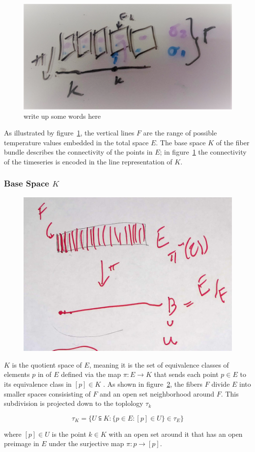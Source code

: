 \documentclass[../main.tex]{subfiles}
\begin{document}
\begin{figure}[ht]
    \includegraphics[width=.2\linewidth]{figures/sections/math/fiberbundle.png}
    \caption{write up some words here}
    \label{fig:fiberbundle}
\end{figure}

As illustrated by figure~\ref{fig:fiberbundle}, the vertical lines $F$ are the range of possible temperature values embedded in the total space $E$. The base space $K$ of the fiber bundle describes the connectivity of the points in $E$; in figure~\ref{fig:fiberbundle} the connectivity of the timeseries is encoded in the line representation of $K$. 

\subsubsection{Base Space $K$}

\begin{figure}[ht]
    \includegraphics[width=0.4\linewidth]{figures/sections/math/k_qspace.png}
    \label{fig:kquote}
\end{figure}

$K$ is the quotient space of $E$, meaning it is the set of equivalence classes of elements $p$ in of $E$ defined via the map $\pi: E \rightarrow K$ that sends each point $p \in E$ to its equivalence class in $[p] \in K$ \cite{QuotientSpaceTopology2020,QuotientSpaceTopology2020}. As shown in figure~\ref{fig:kquote}, the fibers $F$ divide $E$ into smaller spaces consisisting of $F$ and an open set neighborhood around $F$. This subdivision is projected down to the toplology $\tau_k$

\begin{equation}
\tau_K = \{U\subseteqq K: \{p \in E: [p] \in U\}\in \tau_E\}
\end{equation}

where $[p] \in U$ is the point $k \in K$ with an open set around it that has an open  preimage in $E$ under the surjective map $\pi: p \rightarrow [p]$. 
\end{document}
